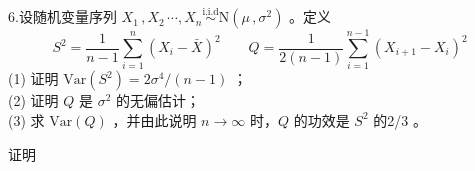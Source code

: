 \documentclass[12pt,hyperref,]{ctexart}
\begin{document}
\kaishu

6.设随机变量序列
\(X_1\, ,X_2\, \cdots ,X_n\overset{\mathrm{i.i.d}}{\sim}\mathrm{N}(\mu\, ,\sigma^2)\)
。定义 \begin{equation*}
S^2=\frac{1}{n-1}\sum_{i=1}^{n}(X_i-\bar{X})^2 \qquad Q=\frac{1}{2(n-1)}\sum_{i=1}^{n-1}(X_{i+1}-X_{i})^2
\end{equation*} (1) 证明 \(\mathrm{Var}(S^2)=2\sigma^4/(n-1)\) ；\\
(2) 证明 \(Q\) 是 \(\sigma^2\) 的无偏估计；\\
(3) 求 \(\mathrm{Var}(Q)\) ，并由此说明 \(n \to \infty\) 时，\(Q\)
的功效是 \(S^2\) 的2/3 。

\vspace{1em}

\heiti

证明

\songti
\end{document}
